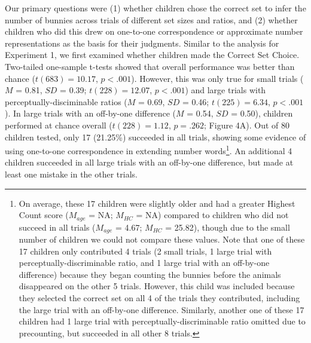 \documentclass[
  man,floatsintext]{apa7}
\begin{document}
Our primary questions were (1) whether children chose the correct set to infer the number of bunnies across trials of different set sizes and ratios, and (2) whether children who did this drew on one-to-one correspondence or approximate number representations as the basis for their judgments. Similar to the analysis for Experiment 1, we first examined whether children made the Correct Set Choice. Two-tailed one-sample t-tests showed that overall performance was better than chance (\(t(683) = 10.17\), \(p < .001\)).
However, this was only true for small trials (\(M\) = 0.81, \(SD\) = 0.39; \(t(228) = 12.07\), \(p < .001\)) and large trials with perceptually-disciminable ratios (\(M\) = 0.69, \(SD\) = 0.46; \(t(225) = 6.34\), \(p < .001\)). In large trials with an off-by-one difference (\(M\) = 0.54, \(SD\) = 0.50), children performed at chance overall (\(t(228) = 1.12\), \(p = .262\); Figure 4A). Out of 80 children tested, only 17 (21.25\%) succeeded in all trials, showing some evidence of using one-to-one correspondence in extending number words\footnote{On average, these 17 children were slightly older and had a greater Highest Count score (\(M_{age}\) = NA; \(M_{HC}\) = NA) compared to children who did not succeed in all trials (\(M_{age}\) = 4.67; \(M_{HC}\) = 25.82), though due to the small number of children we could not compare these values. Note that one of these 17 children only contributed 4 trials (2 small trials, 1 large trial with perceptually-discriminable ratio, and 1 large trial with an off-by-one difference) because they began counting the bunnies before the animals disappeared on the other 5 trials. However, this child was included because they selected the correct set on all 4 of the trials they contributed, including the large trial with an off-by-one difference. Similarly, another one of these 17 children had 1 large trial with perceptually-discriminable ratio omitted due to precounting, but succeeded in all other 8 trials.}.
An additional 4 children succeeded in all large trials with an off-by-one difference, but made at least one mistake in the other trials.
\end{document}

